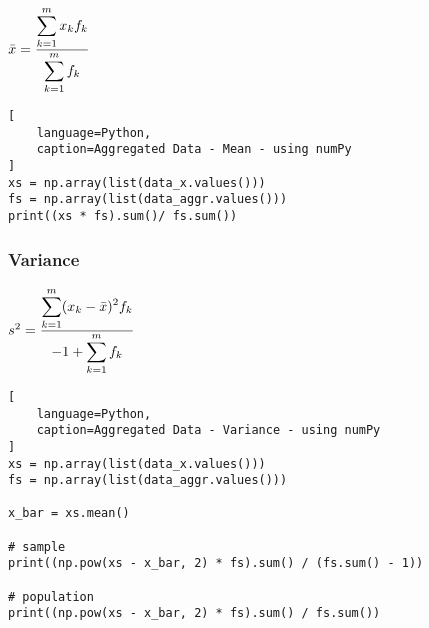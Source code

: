 $
    \bar{x}
    = \dfrac{
        \displaystyle\sum_{k=1}^{m} x_kf_k
    }{
        \displaystyle\sum_{k=1}^{m} f_k
    }
$

\begin{lstlisting}[
    language=Python,
    caption=Aggregated Data - Mean - using numPy
]
xs = np.array(list(data_x.values()))
fs = np.array(list(data_aggr.values()))
print((xs * fs).sum()/ fs.sum())
\end{lstlisting}



\subsubsection{Variance \cite{statistics/book/Statistics-for-Data-Scientists/Maurits-Kaptein}}\label{Data/Describing Data/Aggregated Data/Variance}

$
    s^2
    = \dfrac{
        \displaystyle\sum_{k=1}^{m} (x_k - \bar{x})^2 f_k
    }{
        -1 + \displaystyle\sum_{k=1}^{m} f_k
    }
$

\begin{lstlisting}[
    language=Python,
    caption=Aggregated Data - Variance - using numPy
]
xs = np.array(list(data_x.values()))
fs = np.array(list(data_aggr.values()))

x_bar = xs.mean()

# sample
print((np.pow(xs - x_bar, 2) * fs).sum() / (fs.sum() - 1))

# population
print((np.pow(xs - x_bar, 2) * fs).sum() / fs.sum())
\end{lstlisting}


